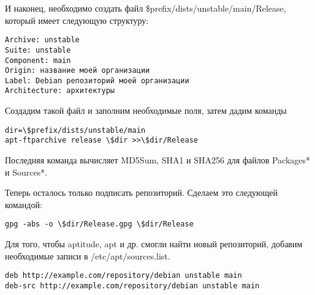 И наконец, необходимо создать файл \$prefix/dists/unstable/main/Release, который имеет следующую структуру:

\begin{lstlisting}
Archive: unstable
Suite: unstable
Component: main
Origin: название моей организации
Label: Debian репозиторий моей организации
Architecture: архитектуры
\end{lstlisting}

Создадим такой файл и заполним необходимые поля, затем дадим команды

\begin{lstlisting}
dir=\$prefix/dists/unstable/main
apt-ftparchive release \$dir >>\$dir/Release
\end{lstlisting}

Последняя команда вычисляет MD5Sum, SHA1 и SHA256 для файлов Packages* и Sources*.

Теперь осталось только подписать репозиторий. Сделаем это следующей командой:

\begin{lstlisting}
gpg -abs -o \$dir/Release.gpg \$dir/Release
\end{lstlisting}

Для того, чтобы aptitude, apt и др. смогли найти новый репозиторий, добавим необходимые записи в /etc/apt/sources.list.

\begin{lstlisting}
deb http://example.com/repository/debian unstable main
deb-src http://example.com/repository/debian unstable main
\end{lstlisting}
